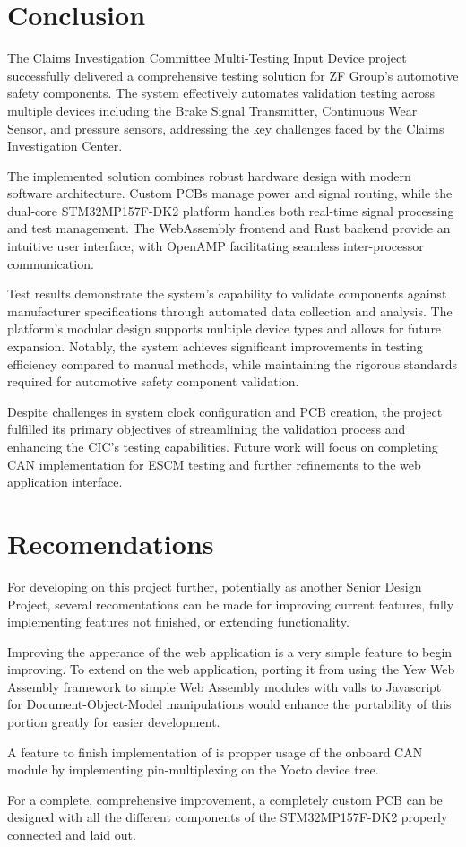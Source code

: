 \documentclass[12pt]{article}
\begin{document}
\pagebreak
\section{Conclusion}

The Claims Investigation Committee Multi-Testing Input Device project
successfully delivered a comprehensive testing solution for ZF Group's
automotive safety components. The system effectively automates validation
testing across multiple devices including the Brake Signal Transmitter,
Continuous Wear Sensor, and pressure sensors, addressing the key challenges
faced by the Claims Investigation Center.

The implemented solution combines robust hardware design with modern software
architecture. Custom PCBs manage power and signal routing, while the dual-core
STM32MP157F-DK2 platform handles both real-time signal processing and test
management. The WebAssembly frontend and Rust backend provide an intuitive user
interface, with OpenAMP facilitating seamless inter-processor communication.

Test results demonstrate the system's capability to validate components against
manufacturer specifications through automated data collection and analysis. The
platform's modular design supports multiple device types and allows for future
expansion. Notably, the system achieves significant improvements in testing
efficiency compared to manual methods, while maintaining the rigorous standards
required for automotive safety component validation.

Despite challenges in system clock configuration and PCB creation, the project
fulfilled its primary objectives of streamlining the validation process and
enhancing the CIC's testing capabilities. Future work will focus on completing
CAN implementation for ESCM testing and further refinements to the web
application interface.

\section{Recomendations}
For developing on this project further, potentially as another Senior Design Project,
several recomentations can be made for improving current features, fully implementing 
features not finished, or extending functionality. 

Improving the apperance of the web application is a very simple feature to begin
improving. To extend on the web application, porting it from using the Yew 
Web Assembly framework to simple Web Assembly modules with valls to Javascript 
for Document-Object-Model manipulations would enhance the portability of this portion
greatly for easier development.

A feature to finish implementation of is propper usage of the onboard CAN module 
by implementing pin-multiplexing on the Yocto device tree.

For a complete, comprehensive improvement, a completely custom PCB can be designed 
with all the different components of the STM32MP157F-DK2 properly connected
and laid out. 
\end{document}
